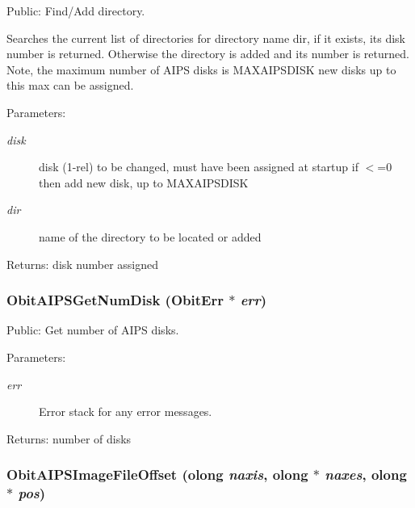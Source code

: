 Public: Find/Add directory. 

Searches the current list of directories for directory name dir, if it exists, its disk number is returned. Otherwise the directory is added and its number is returned. Note, the maximum number of AIPS disks is MAXAIPSDISK new disks up to this max can be assigned. \begin{Desc}
\item[Parameters:]
\begin{description}
\item[{\em disk}]disk (1-rel) to be changed, must have been assigned at startup if $<$=0 then add new disk, up to MAXAIPSDISK \item[{\em dir}]name of the directory to be located or added \end{description}
\end{Desc}
\begin{Desc}
\item[Returns:]disk number assigned \end{Desc}
\subsubsection{ Obit\-AIPSGet\-Num\-Disk ({\bf Obit\-Err} $\ast$ {\em err})}\label{ObitAIPS_8c_a11}


Public: Get number of AIPS disks. 

\begin{Desc}
\item[Parameters:]
\begin{description}
\item[{\em err}]Error stack for any error messages. \end{description}
\end{Desc}
\begin{Desc}
\item[Returns:]number of disks \end{Desc}
\subsubsection{ Obit\-AIPSImage\-File\-Offset ({\bf olong} {\em naxis}, {\bf olong} $\ast$ {\em naxes}, {\bf olong} $\ast$ {\em pos})}\label{ObitAIPS_8c_a12}


